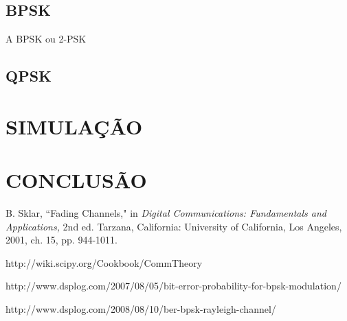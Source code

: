 \documentclass[a4paper,twocolumn]{article}
\begin{document}
\subsection{BPSK}

A BPSK ou 2-PSK

\subsection{QPSK}


\section{SIMULAÇÃO}


\section{CONCLUSÃO}


\begin{thebibliography}{9}
        B. Sklar,
        ``Fading Channels,"
        in \textit{Digital Communications: Fundamentals and Applications,}
        2nd ed.
        Tarzana, California: University of California, Los Angeles,
        2001, ch. 15, pp. 944-1011.

        http://wiki.scipy.org/Cookbook/CommTheory

        http://www.dsplog.com/2007/08/05/bit-error-probability-for-bpsk-modulation/

        http://www.dsplog.com/2008/08/10/ber-bpsk-rayleigh-channel/
\end{thebibliography}
\end{document}
